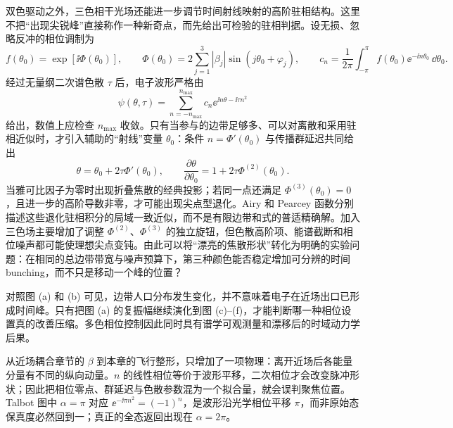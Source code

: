 双色驱动之外，三色相干光场还能进一步调节时间射线映射的高阶驻相结构。这里不把“出现尖锐峰”直接称作一种新奇点，而先给出可检验的驻相判据。设无损、忽略反冲的相位调制为
\begin{equation}
 f(\theta_0)=\exp\!\left[\ii\Phi(\theta_0)\right],\qquad
 \Phi(\theta_0)=2\sum_{j=1}^{3}|\beta_j|\sin(j\theta_0+\varphi_j),
 \qquad c_n=\frac1{2\pi}\int_{-\pi}^{\pi} f(\theta_0)\ee^{-\ii n\theta_0}\,\dd \theta_0 .
 \label{eq:ch02-three-color-phase}
\end{equation}
经过无量纲二次谱色散 $\tau$ 后，电子波形严格由
\begin{equation}
 \psi(\theta,\tau)=\sum_{n=-n_{\max}}^{n_{\max}}c_n \ee^{\ii n\theta-\ii\tau n^2}
 \label{eq:ch02-three-color-wave}
\end{equation}
给出，数值上应检查 $n_{\max}$ 收敛。只有当参与的边带足够多、可以对离散和采用驻相近似时，才引入辅助的“射线”变量 $\theta_0$：条件 $n=\Phi'(\theta_0)$ 与传播群延迟共同给出
\begin{equation}
 \theta=\theta_0+2\tau\Phi'(\theta_0),\qquad
 \frac{\partial\theta}{\partial\theta_0}=1+2\tau\Phi^{(2)}(\theta_0).
 \label{eq:ch02-caustic-ray}
\end{equation}
当雅可比因子为零时出现折叠焦散的经典投影；若同一点还满足 $\Phi^{(3)}(\theta_0)=0$，且进一步的高阶导数非零，才可能出现尖点型退化。Airy 和 Pearcey 函数分别描述这些退化驻相积分的局域一致近似，而不是有限边带和式的普适精确解。加入三色场主要增加了调整 $\Phi^{(2)}$、$\Phi^{(3)}$ 的独立旋钮，但色散高阶项、能谱截断和相位噪声都可能使理想尖点变钝。由此可以将“漂亮的焦散形状”转化为明确的实验问题：在相同的总边带带宽与噪声预算下，第三种颜色能否稳定增加可分辨的时间 bunching，而不只是移动一个峰的位置？

对照图 (a) 和 (b) 可见，边带人口分布发生变化，并不意味着电子在近场出口已形成时间峰。只有把图 (a) 的复振幅继续演化到图 (c)--(f)，才能判断哪一种相位设置真的改善压缩。多色相位控制因此同时具有谱学可观测量和漂移后的时域动力学后果。

\clearpage
\par\medskip 从近场耦合章节的 $\beta$ 到本章的飞行整形，只增加了一项物理：离开近场后各能量分量有不同的纵向动量。$n$ 的线性相位等价于波形平移，二次相位才会改变脉冲形状；因此把相位零点、群延迟与色散参数混为一个拟合量，就会误判聚焦位置。Talbot 图中 $\alpha=\pi$ 对应 $\ee^{-\ii\pi n^2}=(-1)^n$，是波形沿光学相位平移 $\pi$，而非原始态保真度必然回到一；真正的全态返回出现在 $\alpha=2\pi$。


